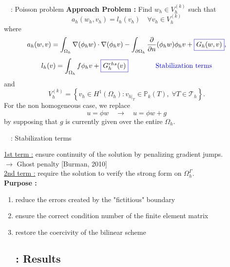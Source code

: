 \begin{frame}{\appendixname~\theappendixframenumber~: Poisson problem}
	\textbf{Approach Problem :} Find $w_h\in V_h^{(k)}$ such that 
	$$a_h(w_h,v_h) = l_h(v_h) \quad \forall v_h \in V_h^{(k)}$$
	where
	$$a_h(w,v)=\int_{\Omega_h} \nabla (\phi_h w) \cdot \nabla (\phi_h v) - \int_{\partial\Omega_h} \frac{\partial}{\partial n}(\phi_h w)\phi_h v+\fcolorbox{blue}{white}{$G_h(w,v)$},$$
	$$l_h(v)=\int_{\Omega_h} f \phi_h v + \fcolorbox{blue}{white}{$G_h^{rhs}(v)$} \qquad \qquad \color{blue}\text{Stabilization terms}$$
	and 
	$$V_h^{(k)}=\left\{v_h\in H^1(\Omega_h):v_{h|_T}\in\mathbb{P}_k(T), \; \forall T\in\mathcal{T}_h\right\}.$$
	For the non homogeneous case, we replace
	$$u=\phi w \quad \rightarrow \quad u=\phi w+g$$ 
	by supposing that $g$ is currently given over the entire $\Omega_h$.
\end{frame}

\begin{frame}{\appendixname~\theappendixframenumber~: Stabilization terms}
	\begin{center}
		\centering
	\end{center}
	\small
	\underline{1st term :} ensure continuity of the solution by penalizing gradient jumps. \\
	$\rightarrow$ Ghost penalty [Burman, 2010] \\
	\underline{2nd term :} require the solution to verify the strong form on $\Omega_h^\Gamma$. \\
	\normalsize
	\textbf{Purpose :} 
	\begin{enumerate}[\ding{217}]
		\item reduce the errors created by the "fictitious" boundary 
		\item ensure the correct condition number of the finite element matrix
		\item restore the coercivity of the bilinear scheme
	\end{enumerate}
\end{frame}
\addtocounter{appendixframenumber}{1}

\subsection{\appendixname~\theappendixframenumber~: Results}

